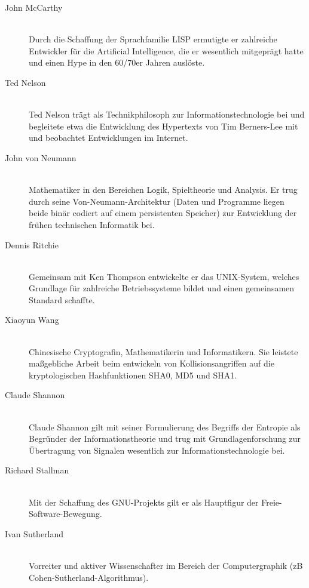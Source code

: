 \begin{description}
  \item[John McCarthy ] \hfill{} \\
    Durch die Schaffung der Sprachfamilie LISP ermutigte er zahlreiche Entwickler für die Artificial Intelligence, die er wesentlich mitgeprägt hatte und einen Hype in den 60/70er Jahren auslöste.

  \item[Ted Nelson ] \hfill{} \\
    Ted Nelson trägt als Technikphilosoph zur Informationstechnologie bei und begleitete etwa die Entwicklung des Hypertexts von Tim Berners-Lee mit und beobachtet Entwicklungen im Internet.

  \item[John von Neumann ] \hfill{} \\
    Mathematiker in den Bereichen Logik, Spieltheorie und Analysis. Er trug durch seine Von-Neumann-Architektur (Daten und Programme liegen beide binär codiert auf einem persistenten Speicher) zur Entwicklung der frühen technischen Informatik bei.

  \item[Dennis Ritchie ] \hfill{} \\
    Gemeinsam mit Ken Thompson entwickelte er das UNIX-System, welches Grundlage für zahlreiche Betriebssysteme bildet und einen gemeinsamen Standard schaffte.

  \item[Xiaoyun Wang ] \hfill{} \\
    Chinesische Cryptografin, Mathematikerin und Informatikern. Sie leistete maßgebliche Arbeit beim entwickeln von Kollisionsangriffen auf die kryptologischen Hashfunktionen SHA0, MD5 und SHA1.

  \item[Claude Shannon ] \hfill{} \\
    Claude Shannon gilt mit seiner Formulierung des Begriffs der Entropie als Begründer der Informationstheorie und trug mit Grundlagenforschung zur Übertragung von Signalen wesentlich zur Informationstechnologie bei.

  \item[Richard Stallman ] \hfill{} \\
    Mit der Schaffung des GNU-Projekts gilt er als Hauptfigur der Freie-Software-Bewegung.

  \item[Ivan Sutherland ] \hfill{} \\
    Vorreiter und aktiver Wissenschafter im Bereich der Computergraphik (zB Cohen-Sutherland-Algorithmus).


\end{description}
